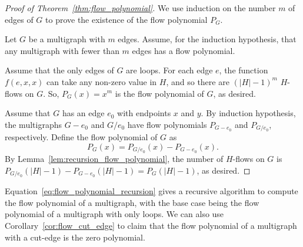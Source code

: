 \begin{proof}[Proof of Theorem~\ref{thm:flow_polynomial}]
	We use induction on the number \(m\) of edges of \(G\) to prove the existence of the flow polynomial \(P_G\).

	Let \(G\) be a multigraph with \(m\) edges.
	Assume, for the induction hypothesis, that any multigraph with fewer than \(m\) edges has a flow polynomial.

	Assume that the only edges of \(G\) are loops.
	For each edge \(e\), the function \(f(e, x, x)\) can take any non-zero value in \(H\),
	and so there are \((|H| - 1)^m\) \(H\)-flows on \(G\).
	So, \(P_G(x) = x^m\) is the flow polynomial of \(G\), as desired.

	Assume that \(G\) has an edge \(e_0\) with endpoints \(x\) and \(y\).
	By induction hypothesis, the multigraphs \(G - e_0\) and \(G / e_0\) have flow polynomials \(P_{G - e_0}\) and \(P_{G / e_0}\), respectively.
	Define the flow polynomial of \(G\) as
	\begin{equation} \label{eq:flow_polynomial_recursion}
		P_G(x) = P_{G / e_0}(x) - P_{G - e_0}(x).
	\end{equation}
	By Lemma~\ref{lem:recursion_flow_polynomial}, the number of \(H\)-flows on \(G\) is \(P_{G / e_0}(|H| - 1) - P_{G - e_0}(|H| - 1) = P_G(|H| - 1)\), as desired.
\end{proof}

Equation~\eqref{eq:flow_polynomial_recursion} gives a recursive algorithm to compute the flow polynomial of a multigraph, with the base case being the flow polynomial of a multigraph with only loops.
We can also use Corollary~\ref{cor:flow_cut_edge} to claim that the flow polynomial of a multigraph with a cut-edge is the zero polynomial.

